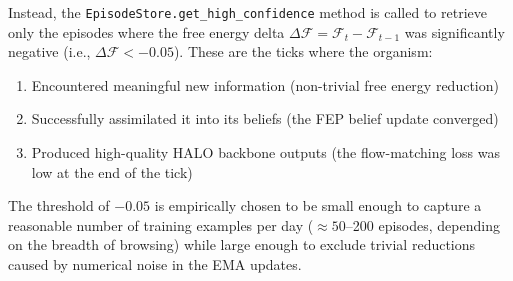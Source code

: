 Instead, the \texttt{EpisodeStore.get\_high\_confidence} method is called to retrieve only the episodes where the free energy delta $\Delta\mathcal{F} = \mathcal{F}_t - \mathcal{F}_{t-1}$ was significantly negative (i.e., $\Delta\mathcal{F} < -0.05$). These are the ticks where the organism:

\begin{enumerate}
    \item Encountered meaningful new information (non-trivial free energy reduction)
    \item Successfully assimilated it into its beliefs (the FEP belief update converged)
    \item Produced high-quality HALO backbone outputs (the flow-matching loss was low at the end of the tick)
\end{enumerate}

The threshold of $-0.05$ is empirically chosen to be small enough to capture a reasonable number of training examples per day ($\approx 50$--200 episodes, depending on the breadth of browsing) while large enough to exclude trivial reductions caused by numerical noise in the EMA updates.

